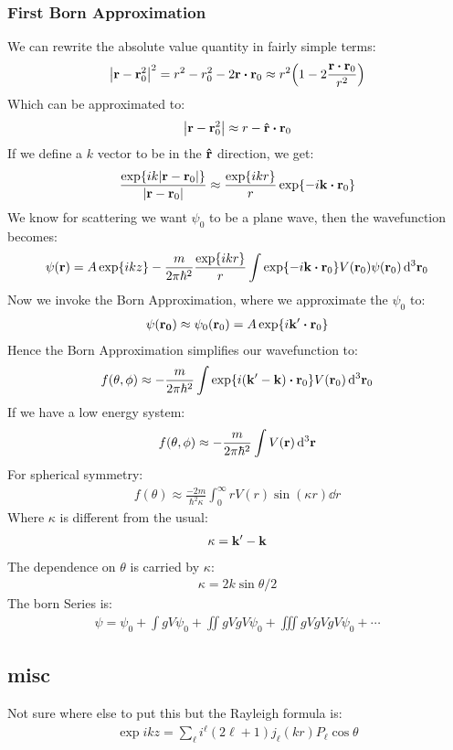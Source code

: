 \subsubsection{First Born Approximation}
We can rewrite the absolute value quantity in fairly simple terms:
\begin{align*}
  \abs{\vb{r-r}_0^2}^2=r^2-r_0^2-2\vb{r\vdot r}_0\approx
  r^2\qty(1-2\frac{\vb{r\vdot r}_0}{r^2})
\end{align*}
Which can be approximated to:
\begin{align*}
  \abs{\vb{r-r}_0^2}\approx r-\vu{r}\vdot\vb{r}_0
\end{align*}
If we define a $k$ vector to be in the $\vu{r}$ direction, we get:
\begin{align*}
  \frac{\exp{ik\abs{\vb{r}-\vb{r}_0}}}{\abs{\vb{r}-\vb{r}_0}}\approx\frac{\exp{ikr}}{r}
  \exp{-i\vb{k}\vdot\vb{r}_0}
\end{align*}
We know for scattering we want $\psi_0$ to be a plane wave, then the wavefunction becomes:
\begin{align*}
  \psi(\vb{r})=A\exp{ikz}-\frac{m}{2\pi\hbar^2}\frac{\exp{ikr}}{r}
  \int\exp{-i\vb{k}\vdot\vb{r}_0}V(\vb{r}_0)\psi(\vb{r}_0)\dd[3]{\vb{r}_0}
\end{align*}
Now we invoke the Born Approximation, where we approximate the $\psi_0$ to:
\begin{align*}
  \psi(\vb{r_0})\approx\psi_0(\vb{r}_0)=A\exp{i\vb{k}'\vdot\vb{r}_0}
\end{align*}
Hence the Born Approximation simplifies our wavefunction to:
\begin{align*}
  f(\theta,\phi)\approx-\frac{m}{2\pi\hbar^2}
  \int\exp{i(\vb{k}'-\vb{k})\vdot\vb{r}_0}V(\vb{r}_0)\dd[3]{\vb{r}_0}
\end{align*}
If we have a low energy system:
\begin{align*}
  f(\theta,\phi)\approx-\frac{m}{2\pi\hbar^2}\int V(\vb{r})\dd[3]{\vb{r}}
\end{align*}
For spherical symmetry:
\begin{align*}
  f(\theta)\approx\frac{-2m}{\hbar^2\kappa}\int_0^\infty rV(r)\sin(\kappa r)\dd{r}
\end{align*}
Where $\kappa$ is different from the usual:
\begin{align*}
  \kappa=\vb{k}'-\vb{k}
\end{align*}
The dependence on $\theta$ is carried by $\kappa$:
\begin{align*}
  \kappa=2k\sin\theta/2
\end{align*}
The born Series is:
\begin{align*}
  \psi=\psi_0+\int gV\psi_0+\iint gVgV\psi_0+\iiint gVgVgV\psi_0+\cdots
\end{align*}
\subsection{misc}
Not sure where else to put this but the Rayleigh formula is:
\begin{align*}
  \exp{ikz}=\sum_\ell i^\ell(2\ell+1)j_\ell(kr)P_\ell\cos\theta
\end{align*}